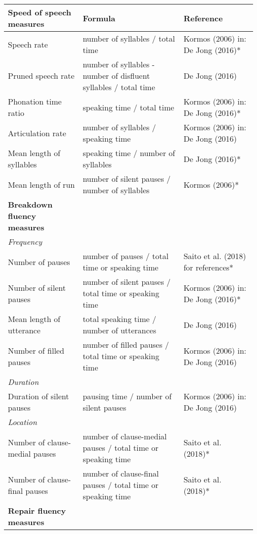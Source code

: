 \begin{flushleft}
\tablefirsthead{}
\tablehead{}
\tabletail{}
\tablelasttail{}
\begin{supertabular}{|m{1.6670599in}|m{2.8441598in}|m{1.7913599in}|}
\hline
\textbf{Speed of speech measures} &
\textbf{Formula } &
\textbf{Reference}\\\hline
Speech rate  &
number of syllables / total time &
Kormos (2006) in: De Jong (2016)*\\\hline
Pruned speech rate &
number of syllables - number of disfluent syllables / total time &
De Jong (2016)\\\hline
Phonation time ratio &
speaking time / total time &
Kormos (2006) in: De Jong (2016)*\\\hline
Articulation rate &
number of syllables / speaking time &
Kormos (2006) in: De Jong (2016)\\\hline
Mean length of syllables &
speaking time / number of syllables  &
De Jong (2016)*\\\hline
Mean length of run &
number of silent pauses / number of syllables &
Kormos (2006)*\\\hline
\textbf{Breakdown fluency measures} &
~ &
~\\\hline
\textit{Frequency} &
~ &
~\\\hline
Number of pauses &
number of pauses / total time or speaking time &
Saito et al. (2018) for references*\\\hline
Number of silent pauses &
number of silent pauses / total time or speaking time &
Kormos (2006) in: De Jong (2016)*\\\hline
Mean length of utterance &
total speaking time / number of utterances &
De Jong (2016)\\\hline
Number of filled pauses &
number of filled pauses / total time or speaking time &
Kormos (2006) in: De Jong (2016)\\\hline
\textit{Duration} &
~ &
~\\\hline
Duration of silent pauses &
pausing time / number of silent pauses &
Kormos (2006) in: De Jong (2016)\\\hline
\textit{Location} &
~ &
~\\\hline
Number of clause-medial pauses  &
number of clause-medial pauses / total time or speaking time &
Saito et al. (2018)*\\\hline
Number of clause-final pauses &
number of clause-final pauses / total time or speaking time &
Saito et al. (2018)*\\\hline
\textbf{Repair fluency measures} &

\end{supertabular}
\end{flushleft}
